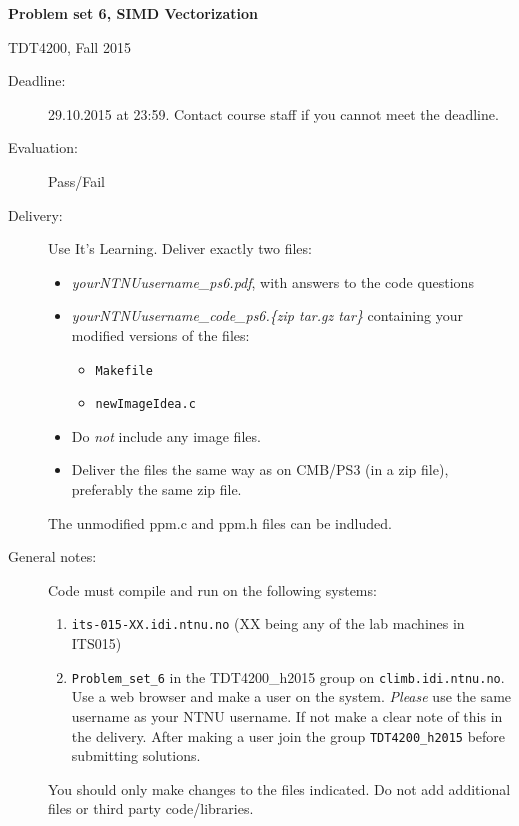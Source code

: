 \documentclass[10pt,a4paper]{article}
\newcommand{\PROBSET}{6}
\begin{document}

{\noindent \LARGE \textbf{Problem set \PROBSET, SIMD Vectorization}}

{\noindent \large TDT4200, Fall 2015}

\begin{description}
	\item[Deadline:] 29.10.2015 at 23:59. Contact course staff if you cannot meet the deadline.
	\item[Evaluation:] Pass/Fail
	\item[Delivery:] Use It's Learning. Deliver exactly two files:
		\begin{itemize}
			\item \emph{yourNTNUusername\_ps\PROBSET.pdf}, with answers to the code questions
			\item \emph{yourNTNUusername\_code\_ps\PROBSET.\{zip \textbar tar.gz \textbar tar\}}
				containing your modified versions of the files:
				\begin{itemize}
					\item \texttt{Makefile}
					\item \texttt{newImageIdea.c}
				\end{itemize}
				\item Do \emph{not} include any image files.
				\item Deliver the files the same way as on CMB/PS3 (in a zip file), preferably the same zip file.
				
		\end{itemize}
		The unmodified ppm.c and ppm.h files can be indluded.

	\item[General notes:] Code must compile and run on the following systems:
	\begin{enumerate}
		\item \texttt{its-015-XX.idi.ntnu.no} (XX being any of the lab machines in ITS015)
		\item \texttt{Problem\_set\_6} in the TDT4200\_h2015 group on \texttt{climb.idi.ntnu.no}. Use a web browser and make a user on the system. \emph{Please} use the same username as your NTNU username. If not make a clear note of this in the delivery. After making a user join the group \texttt{TDT4200\_h2015} before submitting solutions.
	\end{enumerate}
		You should only make changes to the files indicated.
		Do not add additional files or third party code/libraries.
\end{description}
\end{document}

